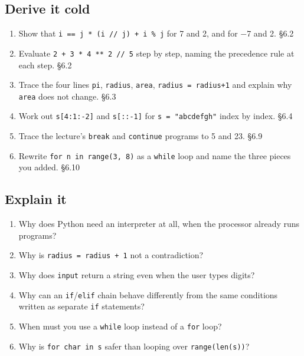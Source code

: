 \documentclass[11pt]{article}
\begin{document}
\begin{keepsection}
\section{Derive it cold}

\begin{enumerate}
\item Show that \texttt{i == j * (i // j) + i \% j} for 7 and 2, and for \ensuremath{-}7 and 2. \hfill{\small\color{FAUblue}§6.2}
\item Evaluate \texttt{2 + 3 * 4 ** 2 // 5} step by step, naming the precedence rule at each step. \hfill{\small\color{FAUblue}§6.2}
\item Trace the four lines \texttt{pi}, \texttt{radius}, \texttt{area}, \texttt{radius = radius+1} and explain why \texttt{area} does not change. \hfill{\small\color{FAUblue}§6.3}
\item Work out \texttt{s[4:1:-2]} and \texttt{s[::-1]} for \texttt{s = "abcdefgh"} index by index. \hfill{\small\color{FAUblue}§6.4}
\item Trace the lecture’s \texttt{break} and \texttt{continue} programs to 5 and 23. \hfill{\small\color{FAUblue}§6.9}
\item Rewrite \texttt{for n in range(3, 8)} as a \texttt{while} loop and name the three pieces you added. \hfill{\small\color{FAUblue}§6.10}
\end{enumerate}
\end{keepsection}

\begin{keepsection}
\section{Explain it}

\begin{enumerate}
\item Why does Python need an interpreter at all, when the processor already runs programs?
\item Why is \texttt{radius = radius + 1} not a contradiction?
\item Why does \texttt{input} return a string even when the user types digits?
\item Why can an \texttt{if}/\texttt{elif} chain behave differently from the same conditions written as separate \texttt{if} statements?
\item When must you use a \texttt{while} loop instead of a \texttt{for} loop?
\item Why is \texttt{for char in s} safer than looping over \texttt{range(len(s))}?
\end{enumerate}

\end{keepsection}
\end{document}
